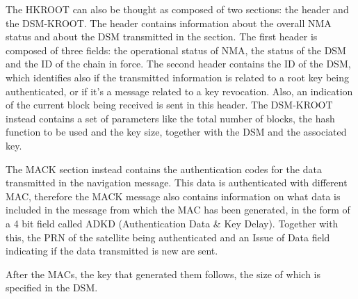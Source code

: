 The HKROOT can also be thought as composed of two sections: the header and the
DSM-KROOT. The header contains information about the overall NMA status and
about the DSM transmitted in the section. The first header is composed of three
fields: the operational status of NMA, the status of the DSM and the ID of the
chain in force. The second header contains the ID of the DSM, which identifies
also if the transmitted information is related to a root key being
authenticated, or if it's a message related to a key revocation. Also, an
indication of the current block being received is sent in this header. The
DSM-KROOT instead contains a set of parameters like the total number of blocks,
the hash function to be used and the key size, together with the DSM and the
associated key.


The MACK section instead contains the authentication codes for the data
transmitted in the navigation message. This data is authenticated with different
MAC, therefore the MACK message also contains information on what data is
included in the message from which the MAC has been generated, in the form of a
4 bit field called ADKD (Authentication Data \& Key Delay). Together with this,
the PRN of the satellite being authenticated and an Issue of Data field
indicating if the data transmitted is new are sent.

After the MACs, the key that generated them follows, the size of which is
specified in the DSM.


